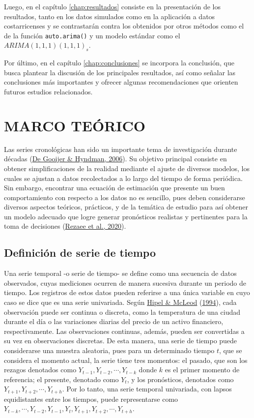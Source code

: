 \documentclass[
]{article}
\begin{document}
Luego, en el capítulo \ref{chap:resultados} consiste en la presentación
de los resultados, tanto en los datos simulados como en la aplicación a
datos costarricenses y se contrastarán contra los obtenidos por otros
métodos como el de la función \texttt{auto.arima()} y un modelo estándar
como el \(ARIMA(1,1,1)(1,1,1)_s\).

Por último, en el capítulo \ref{chap:conclusiones} se incorpora la
conclusión, que busca plantear la discusión de los principales
resultados, así como señalar las conclusiones más importantes y ofrecer
algunas recomendaciones que orienten futuros estudios relacionados.

\newpage

\section{MARCO TEÓRICO}


\label{chap:marco_teorico}

Las series cronológicas han sido un importante tema de investigación
durante décadas (\protect\hyperlink{ref-tsa_decades}{De Gooijer \&
Hyndman, 2006}). Su objetivo principal consiste en obtener
simplificaciones de la realidad mediante el ajuste de diversos modelos,
los cuales se ajustan a datos recolectados a lo largo del tiempo de
forma periódica. Sin embargo, encontrar una ecuación de estimación que
presente un buen comportamiento con respecto a los datos no es sencillo,
pues deben considerarse diversos aspectos teóricos, prácticos, y de la
temática de estudio para así obtener un modelo adecuado que logre
generar pronósticos realistas y pertinentes para la toma de decisiones
(\protect\hyperlink{ref-tsa_decision_making}{Rezaee et al., 2020}).

\subsection{Definición de serie de tiempo}

Una serie temporal -o serie de tiempo- se define como una secuencia de
datos observados, cuyas mediciones ocurren de manera sucesiva durante un
periodo de tiempo. Los registros de estos datos pueden referirse a una
única variable en cuyo caso se dice que es una serie univariada. Según
\protect\hyperlink{ref-Hipel}{Hipel \& McLeod}
(\protect\hyperlink{ref-Hipel}{1994}), cada observación puede ser
continua o discreta, como la temperatura de una ciudad durante el día o
las variaciones diarias del precio de un activo financiero,
respectivamente. Las observaciones continuas, además, pueden ser
convertidas a su vez en observaciones discretas. De esta manera, una
serie de tiempo puede considerarse una muestra aleatoria, pues para un
determinado tiempo \(t\), que se considera el momento actual, la serie
tiene tres momentos: el pasado, que son los rezagos denotados como
\(Y_{t-1}, Y_{t-2}, \cdots, Y_{t-k}\) donde \(k\) es el primer momento
de referencia; el presente, denotado como \(Y_t\), y los pronósticos,
denotados como \(Y_{t+1}, Y_{t+2}, \cdots, Y_{t+h}\). Por lo tanto, una
serie temporal univariada, con lapsos equidistantes entre los tiempos,
puede representarse como
\(Y_{t-k}, \cdots, Y_{t-2}, Y_{t-1}, Y_t, Y_{t+1}, Y_{t+2}, \cdots, Y_{t+h}\).
\end{document}
